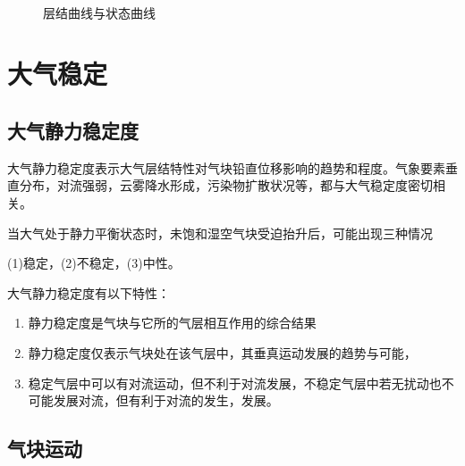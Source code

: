 \documentclass[UTF8,a4paper,11pt,oneside]{ctexbook}
\begin{document}
\begin{figure}[htbp]
\begin{minipage}{0.49\linewidth}
    \end{minipage}\\
    \begin{minipage}{0.7\linewidth}
        \centering
        \caption{层结曲线与状态曲线}
    \end{minipage}
\end{figure}

\chapter{大气稳定}

\section{大气静力稳定度}

大气静力稳定度表示大气层结特性对气块铅直位移影响的趋势和程度。气象要素垂直分布，对流强弱，云雾降水形成，污染物扩散状况等，都与大气稳定度密切相关。

当大气处于静力平衡状态时，未饱和湿空气块受迫抬升后，可能出现三种情况

(1)稳定，(2)不稳定，(3)中性。

大气静力稳定度有以下特性：
\begin{enumerate}
    \item 静力稳定度是气块与它所的气层相互作用的综合结果
    \item 静力稳定度仅表示气块处在该气层中，其垂真运动发展的趋势与可能，
    \item 稳定气层中可以有对流运动，但不利于对流发展，不稳定气层中若无扰动也不可能发展对流，但有利于对流的发生，发展。
\end{enumerate}

\section{气块运动}
\end{document}
